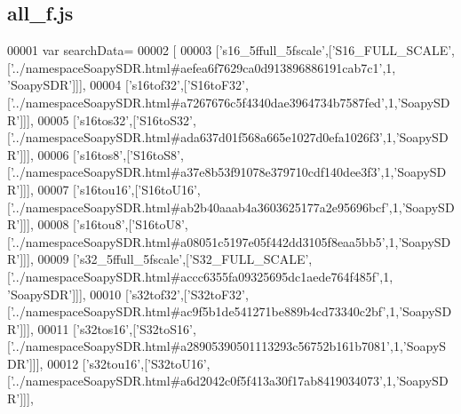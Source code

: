 \subsection{all\+\_\+f.\+js}
\label{all__f_8js_source}

\begin{DoxyCode}
00001 var searchData=
00002 [
00003   [\textcolor{stringliteral}{'s16\_5ffull\_5fscale'},[\textcolor{stringliteral}{'S16\_FULL\_SCALE'},[\textcolor{stringliteral}{'../namespaceSoapySDR.html#aefea6f7629ca0d913896886191cab7c1'},1,\textcolor{stringliteral}{
      'SoapySDR'}]]],
00004   [\textcolor{stringliteral}{'s16tof32'},[\textcolor{stringliteral}{'S16toF32'},[\textcolor{stringliteral}{'../namespaceSoapySDR.html#a7267676c5f4340dae3964734b7587fed'},1,\textcolor{stringliteral}{'SoapySDR'}]]],
00005   [\textcolor{stringliteral}{'s16tos32'},[\textcolor{stringliteral}{'S16toS32'},[\textcolor{stringliteral}{'../namespaceSoapySDR.html#ada637d01f568a665e1027d0efa1026f3'},1,\textcolor{stringliteral}{'SoapySDR'}]]],
00006   [\textcolor{stringliteral}{'s16tos8'},[\textcolor{stringliteral}{'S16toS8'},[\textcolor{stringliteral}{'../namespaceSoapySDR.html#a37e8b53f91078e379710cdf140dee3f3'},1,\textcolor{stringliteral}{'SoapySDR'}]]],
00007   [\textcolor{stringliteral}{'s16tou16'},[\textcolor{stringliteral}{'S16toU16'},[\textcolor{stringliteral}{'../namespaceSoapySDR.html#ab2b40aaab4a3603625177a2e95696bcf'},1,\textcolor{stringliteral}{'SoapySDR'}]]],
00008   [\textcolor{stringliteral}{'s16tou8'},[\textcolor{stringliteral}{'S16toU8'},[\textcolor{stringliteral}{'../namespaceSoapySDR.html#a08051c5197e05f442dd3105f8eaa5bb5'},1,\textcolor{stringliteral}{'SoapySDR'}]]],
00009   [\textcolor{stringliteral}{'s32\_5ffull\_5fscale'},[\textcolor{stringliteral}{'S32\_FULL\_SCALE'},[\textcolor{stringliteral}{'../namespaceSoapySDR.html#accc6355fa09325695dc1aede764f485f'},1,\textcolor{stringliteral}{
      'SoapySDR'}]]],
00010   [\textcolor{stringliteral}{'s32tof32'},[\textcolor{stringliteral}{'S32toF32'},[\textcolor{stringliteral}{'../namespaceSoapySDR.html#ac9f5b1de541271be889b4cd73340c2bf'},1,\textcolor{stringliteral}{'SoapySDR'}]]],
00011   [\textcolor{stringliteral}{'s32tos16'},[\textcolor{stringliteral}{'S32toS16'},[\textcolor{stringliteral}{'../namespaceSoapySDR.html#a28905390501113293c56752b161b7081'},1,\textcolor{stringliteral}{'SoapySDR'}]]],
00012   [\textcolor{stringliteral}{'s32tou16'},[\textcolor{stringliteral}{'S32toU16'},[\textcolor{stringliteral}{'../namespaceSoapySDR.html#a6d2042c0f5f413a30f17ab8419034073'},1,\textcolor{stringliteral}{'SoapySDR'}]]],

\end{DoxyCode}
